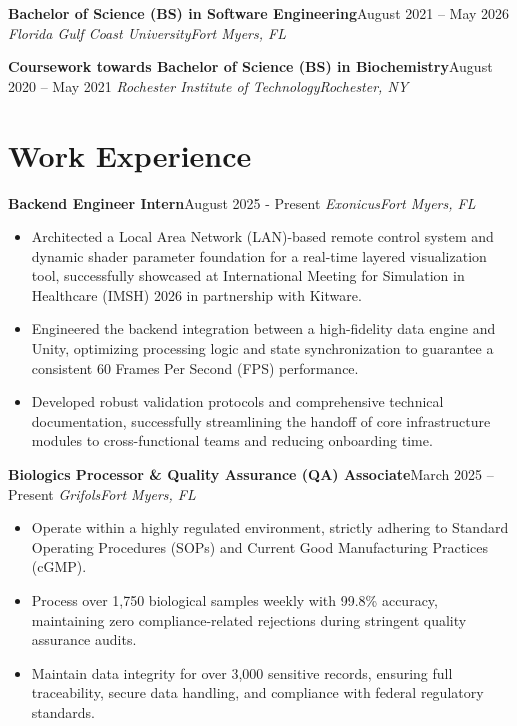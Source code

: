 \documentclass[letterpaper,11pt]{article}
\newcommand{\resumeEntry}[4]{
    \vspace{2pt}
    \noindent\textbf{#1}\hfill{#2}
    \newline
    \noindent\textit{#3}\hfill\textit{#4}
    \vspace{-3pt}
}
\newcommand{\resumeItemListStart}{\begin{itemize}[label=$\bullet$, leftmargin=1.1em, itemsep=0pt, parsep=0pt, topsep=2pt]}
\newcommand{\resumeItemListEnd}{\end{itemize}}
\begin{document}
    \resumeEntry
        {Bachelor of Science (BS) in Software Engineering}
        {August 2021 – May 2026}
        {Florida Gulf Coast University}
        {Fort Myers, FL}
        
    \resumeEntry
        {Coursework towards Bachelor of Science (BS) in Biochemistry}
        {August 2020 – May 2021}
        {Rochester Institute of Technology}
        {Rochester, NY}

\section{Work Experience}
    \resumeEntry
        {Backend Engineer Intern}
        {August 2025 - Present}
        {Exonicus}
        {Fort Myers, FL}
    \resumeItemListStart
        \item Architected a Local Area Network (LAN)-based remote control system and dynamic shader parameter foundation for a real-time layered visualization tool, successfully showcased at International Meeting for Simulation in Healthcare (IMSH) 2026 in partnership with Kitware.
        \item Engineered the backend integration between a high-fidelity data engine and Unity, optimizing processing logic and state synchronization to guarantee a consistent 60 Frames Per Second (FPS) performance.
        \item Developed robust validation protocols and comprehensive technical documentation, successfully streamlining the handoff of core infrastructure modules to cross-functional teams and reducing onboarding time.
    \resumeItemListEnd

    \resumeEntry
        {Biologics Processor \& Quality Assurance (QA) Associate}
        {March 2025 – Present}
        {Grifols}
        {Fort Myers, FL}
    \resumeItemListStart
        \item Operate within a highly regulated environment, strictly adhering to Standard Operating Procedures (SOPs) and Current Good Manufacturing Practices (cGMP).
        \item Process over 1,750 biological samples weekly with 99.8\% accuracy, maintaining zero compliance-related rejections during stringent quality assurance audits.
        \item Maintain data integrity for over 3,000 sensitive records, ensuring full traceability, secure data handling, and compliance with federal regulatory standards.
    \resumeItemListEnd
\end{document}
